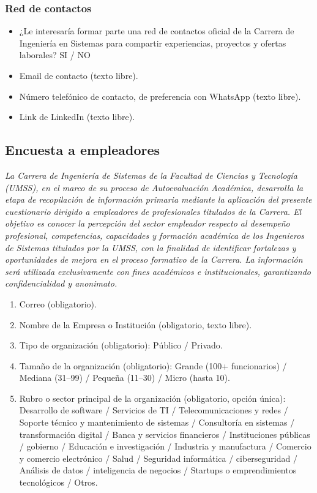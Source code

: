 \documentclass[12pt]{article}
\begin{document}
\subsubsection*{Red de contactos}

\begin{itemize}[nosep]
    \item ¿Le interesaría formar parte una red de contactos oficial de la
    Carrera de Ingeniería en Sistemas para compartir experiencias,
    proyectos y ofertas laborales? SI / NO
    \item Email de contacto (texto libre).
    \item Número telefónico de contacto, de preferencia con WhatsApp
    (texto libre).
    \item Link de LinkedIn (texto libre).
\end{itemize}

\subsection*{Encuesta a empleadores}

\textit{La Carrera de Ingeniería de Sistemas de la Facultad de Ciencias y
Tecnología (UMSS), en el marco de su proceso de Autoevaluación Académica,
desarrolla la etapa de recopilación de información primaria mediante la
aplicación del presente cuestionario dirigido a empleadores de
profesionales titulados de la Carrera. El objetivo es conocer la
percepción del sector empleador respecto al desempeño profesional,
competencias, capacidades y formación académica de los Ingenieros de
Sistemas titulados por la UMSS, con la finalidad de identificar
fortalezas y oportunidades de mejora en el proceso formativo de la
Carrera. La información será utilizada exclusivamente con fines
académicos e institucionales, garantizando confidencialidad y anonimato.}

\begin{enumerate}
    \item Correo (obligatorio).
    \item Nombre de la Empresa o Institución (obligatorio, texto libre).
    \item Tipo de organización (obligatorio): Público / Privado.
    \item Tamaño de la organización (obligatorio): Grande (100+
    funcionarios) / Mediana (31--99) / Pequeña (11--30) / Micro (hasta 10).
    \item Rubro o sector principal de la organización (obligatorio,
    opción única): Desarrollo de software / Servicios de TI /
    Telecomunicaciones y redes / Soporte técnico y mantenimiento de
    sistemas / Consultoría en sistemas / transformación digital / Banca y
    servicios financieros / Instituciones públicas / gobierno / Educación
    e investigación / Industria y manufactura / Comercio y comercio
    electrónico / Salud / Seguridad informática / ciberseguridad /
    Análisis de datos / inteligencia de negocios / Startups o
    emprendimientos tecnológicos / Otros.
\end{enumerate}
\end{document}
